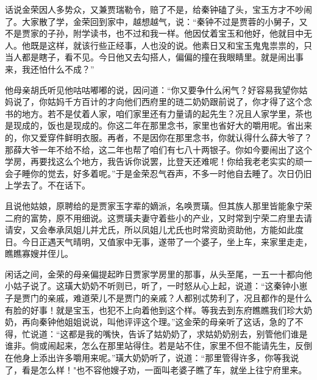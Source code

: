话说金荣因人多势众，又兼贾瑞勒令，赔了不是，给秦钟磕了头，宝玉方才不吵闹了。大家散了学，金荣回到家中，越想越气，说：“秦钟不过是贾蓉的小舅子，又不是贾家的子孙，附学读书，也不过和我一样。他因仗着宝玉和他好，他就目中无人。他既是这样，就该行些正经事，人也没的说。他素日又和宝玉鬼鬼祟祟的，只当人都是瞎子，看不见。今日他又去勾搭人，偏偏的撞在我眼睛里。就是闹出事来，我还怕什么不成？”

他母亲胡氏听见他咕咕嘟嘟的说，因问道：“你又要争什么闲气？好容易我望你姑妈说了，你姑妈千方百计的才向他们西府里的琏二奶奶跟前说了，你才得了这个念书的地方。若不是仗着人家，咱们家里还有力量请的起先生？况且人家学里，茶也是现成的，饭也是现成的。你这二年在那里念书，家里也省好大的嚼用呢。省出来的，你又爱穿件鲜明衣服。再者，不是因你在那里念书，你就认得什么薛大爷了？那薛大爷一年不给不给，这二年也帮了咱们有七八十两银子。你如今要闹出了这个学房，再要找这么个地方，我告诉你说罢，比登天还难呢！你给我老老实实的顽一会子睡你的觉去，好多着呢。”于是金荣忍气吞声，不多一时他自去睡了。次日仍旧上学去了。不在话下。

且说他姑娘，原聘给的是贾家玉字辈的嫡派，名唤贾璜。但其族人那里皆能象宁荣二府的富势，原不用细说。这贾璜夫妻守着些小的产业，又时常到宁荣二府里去请请安，又会奉承凤姐儿并尤氏，所以凤姐儿尤氏也时常资助资助他，方能如此度日。今日正遇天气晴明，又值家中无事，遂带了一个婆子，坐上车，来家里走走，瞧瞧寡嫂并侄儿。

闲话之间，金荣的母亲偏提起昨日贾家学房里的那事，从头至尾，一五一十都向他小姑子说了。这璜大奶奶不听则已，听了，一时怒从心上起，说道：“这秦钟小崽子是贾门的亲戚，难道荣儿不是贾门的亲戚？人都别忒势利了，况且都作的是什么有脸的好事！就是宝玉，也犯不上向着他到这个样。等我去到东府瞧瞧我们珍大奶奶，再向秦钟他姐姐说说，叫他评评这个理。”这金荣的母亲听了这话，急的了不得，忙说道：“这都是我的嘴快，告诉了姑奶奶了，求姑奶奶别去，别管他们谁是谁非。倘或闹起来，怎么在那里站得住。若是站不住，家里不但不能请先生，反倒在他身上添出许多嚼用来呢。”璜大奶奶听了，说道：“那里管得许多，你等我说了，看是怎么样！"也不容他嫂子劝，一面叫老婆子瞧了车，就坐上往宁府里来。

